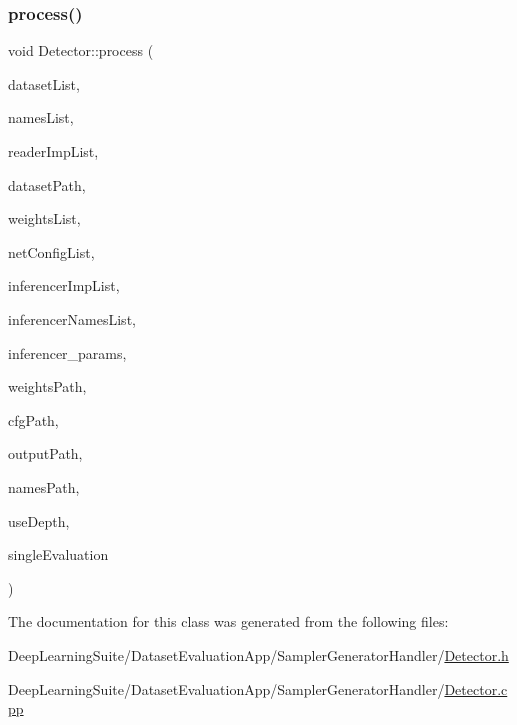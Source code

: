 \subsubsection{\texorpdfstring{process()}{process()}}
{\footnotesize\ttfamily void Detector\+::process (\begin{DoxyParamCaption}\item[{Q\+List\+View $\ast$}]{dataset\+List,  }\item[{Q\+List\+View $\ast$}]{names\+List,  }\item[{Q\+List\+View $\ast$}]{reader\+Imp\+List,  }\item[{const std\+::string \&}]{dataset\+Path,  }\item[{Q\+List\+View $\ast$}]{weights\+List,  }\item[{Q\+List\+View $\ast$}]{net\+Config\+List,  }\item[{Q\+List\+View $\ast$}]{inferencer\+Imp\+List,  }\item[{Q\+List\+View $\ast$}]{inferencer\+Names\+List,  }\item[{Q\+Group\+Box $\ast$}]{inferencer\+\_\+params,  }\item[{const std\+::string \&}]{weights\+Path,  }\item[{const std\+::string \&}]{cfg\+Path,  }\item[{const std\+::string \&}]{output\+Path,  }\item[{const std\+::string \&}]{names\+Path,  }\item[{bool}]{use\+Depth,  }\item[{bool}]{single\+Evaluation }\end{DoxyParamCaption})\hspace{0.3cm}{\ttfamily [static]}}



The documentation for this class was generated from the following files\+:\begin{DoxyCompactItemize}
\item 
Deep\+Learning\+Suite/\+Dataset\+Evaluation\+App/\+Sampler\+Generator\+Handler/\hyperlink{_dataset_evaluation_app_2_sampler_generator_handler_2_detector_8h}{Detector.\+h}\item 
Deep\+Learning\+Suite/\+Dataset\+Evaluation\+App/\+Sampler\+Generator\+Handler/\hyperlink{_dataset_evaluation_app_2_sampler_generator_handler_2_detector_8cpp}{Detector.\+cpp}\end{DoxyCompactItemize}
